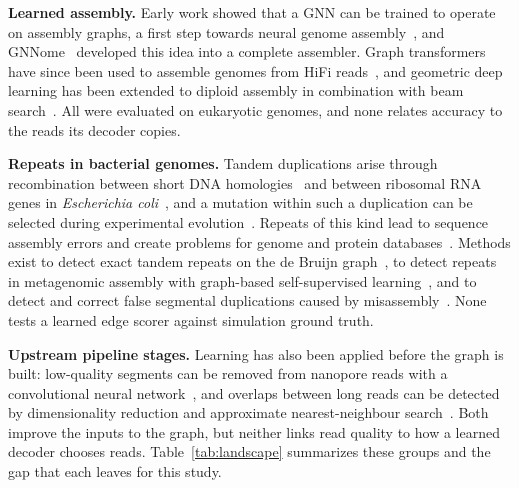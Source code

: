 \documentclass[a4paper]{llncs}
\begin{document}
\textbf{Learned assembly.} Early work showed that a GNN can be trained to operate on assembly graphs, a first step towards neural genome assembly~\cite{neuralasm}, and GNNome~\cite{gnnome} developed this idea into a complete assembler. Graph transformers have since been used to assemble genomes from HiFi reads~\cite{gtasm}, and geometric deep learning has been extended to diploid assembly in combination with beam search~\cite{dipgnnome}. All were evaluated on eukaryotic genomes, and none relates accuracy to the reads its decoder copies.

\textbf{Repeats in bacterial genomes.} Tandem duplications arise through recombination between short DNA homologies~\cite{tdrecomb} and between ribosomal RNA genes in \emph{Escherichia coli}~\cite{rrnadup}, and a mutation within such a duplication can be selected during experimental evolution~\cite{tdadapt}. Repeats of this kind lead to sequence assembly errors and create problems for genome and protein databases~\cite{tderrors}. Methods exist to detect exact tandem repeats on the de Bruijn graph~\cite{dextar}, to detect repeats in metagenomic assembly with graph-based self-supervised learning~\cite{metarepeat}, and to detect and correct false segmental duplications caused by misassembly~\cite{segdup}. None tests a learned edge scorer against simulation ground truth.

\textbf{Upstream pipeline stages.} Learning has also been applied before the graph is built: low-quality segments can be removed from nanopore reads with a convolutional neural network~\cite{miniscrub}, and overlaps between long reads can be detected by dimensionality reduction and approximate nearest-neighbour search~\cite{fedrann}. Both improve the inputs to the graph, but neither links read quality to how a learned decoder chooses reads. Table~\ref{tab:landscape} summarizes these groups and the gap that each leaves for this study.
\end{document}
